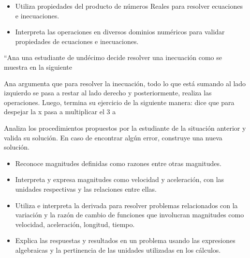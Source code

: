 \evidencias

\begin{itemize}
  \item Utiliza propiedades del producto de números Reales para resolver ecuaciones e inecuaciones.
  \item Interpreta las operaciones en diversos dominios numéricos para validar propiedades de ecuaciones e inecuaciones.
\end{itemize}

\ejemplo

“Ana una estudiante de undécimo decide resolver una inecuación como se muestra en la siguiente


Ana argumenta que para resolver la inecuación, todo lo que está sumando al lado izquierdo se pasa a restar al lado derecho y posteriormente, realiza las operaciones. Luego, termina su ejercicio de la siguiente manera: dice que para despejar la x pasa a multiplicar el 3 a


Analiza los procedimientos propuestos por la estudiante de la situación anterior y valida su solución. En caso de encontrar algún error, construye una nueva solución.


\evidencias

\begin{itemize}
  \item Reconoce magnitudes definidas como razones entre otras magnitudes.
  \item Interpreta y expresa magnitudes como velocidad y aceleración, con las unidades respectivas y las relaciones entre ellas.
  \item Utiliza e interpreta la derivada para resolver problemas relacionados con la variación y la razón de cambio de funciones que involucran magnitudes como velocidad, aceleración, longitud, tiempo.
  \item Explica las respuestas y resultados en un problema usando las expresiones algebraicas y la pertinencia de las unidades utilizadas en los cálculos.
\end{itemize}

